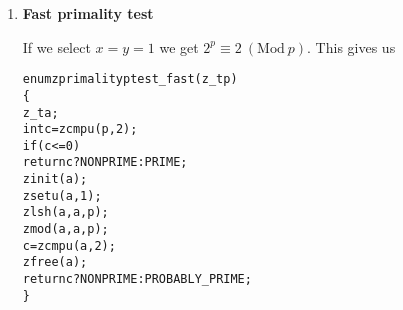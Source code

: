 \begin{enumerate}[label=\textbf{\arabic*}.]
\item \textbf{Fast primality test}

If we select $x = y = 1$ we get
$2^p \equiv 2 ~(\text{Mod}~p)$. This gives us

\vspace{-1em}
\begin{alltt}
enum zprimality ptest_fast(z_t p)
\{
    z_t a;
    int c = zcmpu(p, 2);
    if (c <= 0)
        return c ? NONPRIME : PRIME;
    zinit(a);
    zsetu(a, 1);
    zlsh(a, a, p);
    zmod(a, a, p);
    c = zcmpu(a, 2);
    zfree(a);
    return c ? NONPRIME : PROBABLY_PRIME;
\}
\end{alltt}



\end{enumerate}
